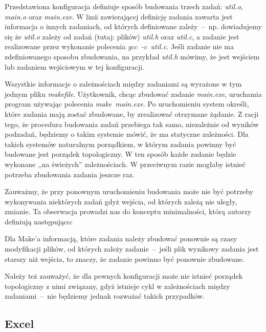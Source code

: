 Przedstawiona konfiguracja definiuje sposób budowania trzech zadań: \textit{util.o}, \textit{main.o} oraz \textit{main.exe}. W linii zawierającej definicję zadania zawarta jest informacja o innych zadaniach, od których definiowane zależy~--~np. dowiadujemy się że \textit{util.o} zależy od zadań (tutaj: plików) \textit{util.h} oraz \textit{util.c}, a zadanie jest realizowane przez wykonanie polecenia \textit{gcc~\nobreakdash-c~util.c}. Jeśli zadanie nie ma zdefiniowanego sposobu zbudowania, na przykład \textit{util.h} mówimy, że jest wejściem lub zadaniem wejściowym w tej konfiguracji.

Wszystkie informacje o zależnościach między zadaniami są wyrażone w tym jednym pliku \textit{makefile}. Użytkownik, chcąc zbudować zadanie \textit{main.exe}, uruchamia program używając polecenia \textit{make~main.exe}. Po uruchomieniu system określi, które zadania mają zostać zbudowane, by zrealizować otrzymane żądanie. Z racji tego, że procedura budowania zadań przebiega tak samo, niezależnie od wyników podzadań, będziemy o takim systemie mówić, że ma statyczne zależności. Dla takich systemów naturalnym porządkiem, w którym zadania powinny być budowane jest porządek topologiczny. W ten sposób każde zadanie będzie wykonane ,,na świeżych'' zależnościach. W przeciwnym razie mogłaby istnieć potrzeba zbudowania zadania jeszcze raz.

Zauważmy, że przy ponownym uruchomieniu budowania może nie być potrzeby wykonywania niektórych zadań gdyż wejścia, od których zależą nie uległy, zmianie. Ta obserwacja prowadzi nas do konceptu minimalności, którą autorzy definiują następująco:


Dla Make'a informacją, które zadania należy zbudować ponownie są czasy modyfikacji plików, od których zależy zadanie~--~jeśli plik wynikowy zadania jest starszy niż wejścia, to znaczy, że zadanie powinno być ponownie zbudowane.

Należy też zauważyć, że dla pewnych konfiguracji może nie istnieć porządek topologiczny z nimi związany, gdyż istnieje cykl w zależnościach między zadaniami~--~nie będziemy jednak rozważać takich przypadków.

\subsection{Excel}

